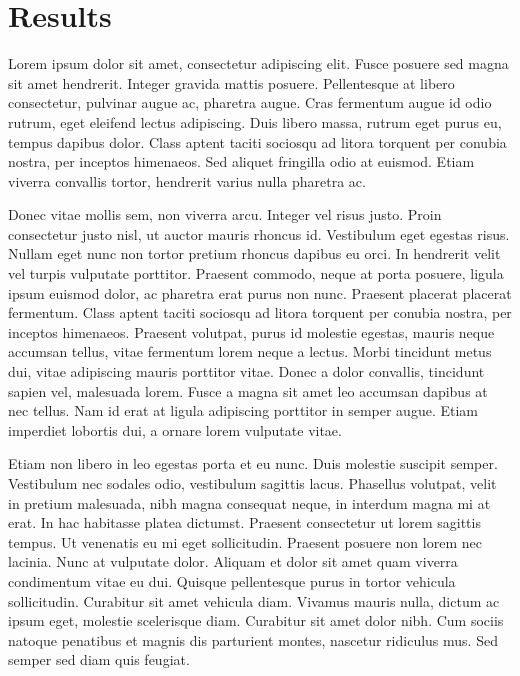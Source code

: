 \documentclass[double,12pt]{beavtex}
\begin{document}

\chapter{Results}

Lorem ipsum dolor sit amet, consectetur adipiscing elit. Fusce posuere sed magna sit amet hendrerit. Integer gravida mattis posuere. Pellentesque at libero consectetur, pulvinar augue ac, pharetra augue. Cras fermentum augue id odio rutrum, eget eleifend lectus adipiscing. Duis libero massa, rutrum eget purus eu, tempus dapibus dolor. Class aptent taciti sociosqu ad litora torquent per conubia nostra, per inceptos himenaeos. Sed aliquet fringilla odio at euismod. Etiam viverra convallis tortor, hendrerit varius nulla pharetra ac. 

Donec vitae mollis sem, non viverra arcu. Integer vel risus justo. Proin consectetur justo nisl, ut auctor mauris rhoncus id. Vestibulum eget egestas risus. Nullam eget nunc non tortor pretium rhoncus dapibus eu orci. In hendrerit velit vel turpis vulputate porttitor. Praesent commodo, neque at porta posuere, ligula ipsum euismod dolor, ac pharetra erat purus non nunc. Praesent placerat placerat fermentum. Class aptent taciti sociosqu ad litora torquent per conubia nostra, per inceptos himenaeos. Praesent volutpat, purus id molestie egestas, mauris neque accumsan tellus, vitae fermentum lorem neque a lectus. Morbi tincidunt metus dui, vitae adipiscing mauris porttitor vitae. Donec a dolor convallis, tincidunt sapien vel, malesuada lorem. Fusce a magna sit amet leo accumsan dapibus at nec tellus. Nam id erat at ligula adipiscing porttitor in semper augue. Etiam imperdiet lobortis dui, a ornare lorem vulputate vitae. 

Etiam non libero in leo egestas porta et eu nunc. Duis molestie suscipit semper. Vestibulum nec sodales odio, vestibulum sagittis lacus. Phasellus volutpat, velit in pretium malesuada, nibh magna consequat neque, in interdum magna mi at erat. In hac habitasse platea dictumst. Praesent consectetur ut lorem sagittis tempus. Ut venenatis eu mi eget sollicitudin. Praesent posuere non lorem nec lacinia. Nunc at vulputate dolor. Aliquam et dolor sit amet quam viverra condimentum vitae eu dui. Quisque pellentesque purus in tortor vehicula sollicitudin. Curabitur sit amet vehicula diam. Vivamus mauris nulla, dictum ac ipsum eget, molestie scelerisque diam. Curabitur sit amet dolor nibh. Cum sociis natoque penatibus et magnis dis parturient montes, nascetur ridiculus mus. Sed semper sed diam quis feugiat. 
\end{document}
